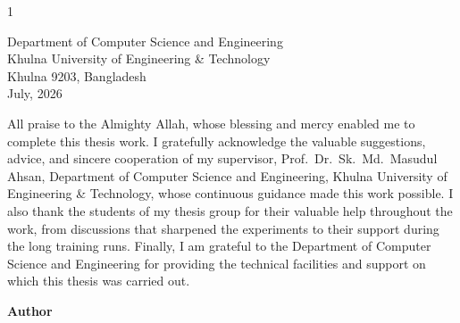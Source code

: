 \documentclass[12pt,a4paper,oneside]{report}
\begin{document}
\begin{spacing}{1}
\vfill
\begin{center}
{\tsizeTwelveHalf
Department of Computer Science and Engineering\\
Khulna University of Engineering \& Technology\\
Khulna 9203, Bangladesh\\
July, 2026\par}
\end{center}
\vspace*{0.32in}
\end{spacing}
\clearpage
 \newpage       %
 \newpage %

All praise to the Almighty Allah, whose blessing and mercy enabled me to
complete this thesis work. I gratefully acknowledge the valuable suggestions,
advice, and sincere cooperation of my supervisor,
Prof.\ Dr.\ Sk.\ Md.\ Masudul Ahsan, Department of Computer Science and
Engineering, Khulna University of Engineering \& Technology, whose continuous
guidance made this work possible. I also thank the students of my thesis
group for their valuable help throughout the work, from discussions that
sharpened the experiments to their support during the long training runs.
Finally, I am grateful to the Department of Computer Science and Engineering
for providing the technical facilities and support on which this thesis was
carried out.

\vspace{2\baselineskip}
\begin{flushright}
\textbf{Author}
\end{flushright}
\clearpage
 \newpage  %
 \newpage %
\end{document}
